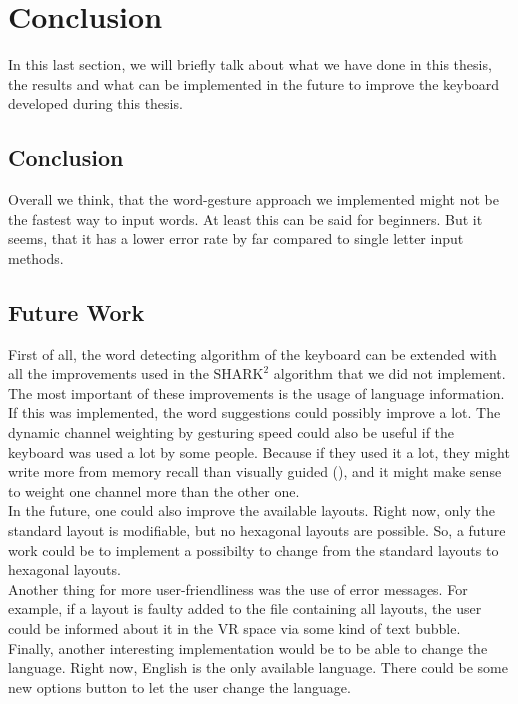 \chapter{Conclusion}

In this last section, we will briefly talk about what we have done in this thesis, the results and what can be implemented in the future to improve the keyboard developed during this thesis.

\section{Conclusion}
Overall we think, that the word-gesture approach we implemented might not be the fastest way to input words. At least this can be said for beginners. But it seems, that it has a lower error rate by far compared to single letter input methods.

\section{Future Work}
First of all, the word detecting algorithm of the keyboard can be extended with all the improvements used in the $\text{SHARK}^2$ algorithm that we did not implement. The most important of these improvements is the usage of language information. If this was implemented, the word suggestions could possibly improve a lot. The dynamic channel weighting by gesturing speed could also be useful if the keyboard was used a lot by some people. Because if they used it a lot, they might write more from memory recall than visually guided (), and it might make sense to weight one channel more than the other one.\\
In the future, one could also improve the available layouts. Right now, only the standard layout is modifiable, but no hexagonal layouts are possible. So, a future work could be to implement a possibilty to change from the standard layouts to hexagonal layouts.\\
Another thing for more user-friendliness was the use of error messages. For example, if a layout is faulty added to the file containing all layouts, the user could be informed about it in the VR space via some kind of text bubble.\\
Finally, another interesting implementation would be to be able to change the language. Right now, English is the only available language. There could be some new options button to let the user change the language.